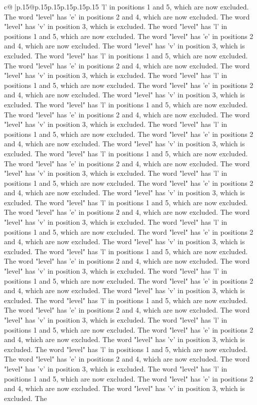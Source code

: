 \documentclass{article}
\begin{document}
{\begin{supertabular}{c@{$\;$}|p{.15\linewidth}@{}p{.15\linewidth}p{.15\linewidth}p{.15\linewidth}p{.15\linewidth}p{.15\linewidth}}
{{{'l' in positions 1 and 5, which are now excluded. The word "level" has 'e' in positions 2 and 4, which are now excluded. The word "level" has 'v' in position 3, which is excluded. The word "level" has 'l' in positions 1 and 5, which are now excluded. The word "level" has 'e' in positions 2 and 4, which are now excluded. The word "level" has 'v' in position 3, which is excluded. The word "level" has 'l' in positions 1 and 5, which are now excluded. The word "level" has 'e' in positions 2 and 4, which are now excluded. The word "level" has 'v' in position 3, which is excluded. The word "level" has 'l' in positions 1 and 5, which are now excluded. The word "level" has 'e' in positions 2 and 4, which are now excluded. The word "level" has 'v' in position 3, which is excluded. The word "level" has 'l' in positions 1 and 5, which are now excluded. The word "level" has 'e' in positions 2 and 4, which are now excluded. The word "level" has 'v' in position 3, which is excluded. The word "level" has 'l' in positions 1 and 5, which are now excluded. The word "level" has 'e' in positions 2 and 4, which are now excluded. The word "level" has 'v' in position 3, which is excluded. The word "level" has 'l' in positions 1 and 5, which are now excluded. The word "level" has 'e' in positions 2 and 4, which are now excluded. The word "level" has 'v' in position 3, which is excluded. The word "level" has 'l' in positions 1 and 5, which are now excluded. The word "level" has 'e' in positions 2 and 4, which are now excluded. The word "level" has 'v' in position 3, which is excluded. The word "level" has 'l' in positions 1 and 5, which are now excluded. The word "level" has 'e' in positions 2 and 4, which are now excluded. The word "level" has 'v' in position 3, which is excluded. The word "level" has 'l' in positions 1 and 5, which are now excluded. The word "level" has 'e' in positions 2 and 4, which are now excluded. The word "level" has 'v' in position 3, which is excluded. The word "level" has 'l' in positions 1 and 5, which are now excluded. The word "level" has 'e' in positions 2 and 4, which are now excluded. The word "level" has 'v' in position 3, which is excluded. The word "level" has 'l' in positions 1 and 5, which are now excluded. The word "level" has 'e' in positions 2 and 4, which are now excluded. The word "level" has 'v' in position 3, which is excluded. The word "level" has 'l' in positions 1 and 5, which are now excluded. The word "level" has 'e' in positions 2 and 4, which are now excluded. The word "level" has 'v' in position 3, which is excluded. The word "level" has 'l' in positions 1 and 5, which are now excluded. The word "level" has 'e' in positions 2 and 4, which are now excluded. The word "level" has 'v' in position 3, which is excluded. The word "level" has 'l' in positions 1 and 5, which are now excluded. The word "level" has 'e' in positions 2 and 4, which are now excluded. The word "level" has 'v' in position 3, which is excluded. The word "level" has 'l' in positions 1 and 5, which are now excluded. The word "level" has 'e' in positions 2 and 4, which are now excluded. The word "level" has 'v' in position 3, which is excluded. The }}}
\end{supertabular}}
\end{document}
